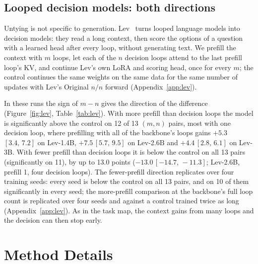 \documentclass[11pt]{article}
\newcommand{\ci}[2]{\,{\scriptsize\ensuremath{[#1,\,#2]}}}
\begin{document}
\subsection{Looped decision models: both directions}
\label{sec:lev}


Untying is not specific to generation. Lev~\citep{lev} turns looped language models into decision models: they read a
long context, then score the options of a question with a learned head after every loop, without generating text. We
prefill the context with $m$ loops, let each of the $n$ decision loops attend to the last prefill loop's KV, and continue
Lev's own LoRA and scoring head, once for every $m$; the control continues the same weights on the same data for the
same number of updates with Lev's Original $n/n$ forward (Appendix~\ref{app:lev}).

In these runs the sign of $m-n$ gives the direction of the difference (Figure~\ref{fig:lev}, Table~\ref{tab:lev}). With more prefill than decision
loops the model is significantly above the control on 12 of 13 $(m,n)$ pairs, most with one decision loop, where prefilling
with all of the backbone's loops gains $+5.3$\ci{3.4}{7.2} on Lev-1.4B, $+7.5$\ci{5.7}{9.5} on Lev-2.6B and
$+4.4$\ci{2.8}{6.1} on Lev-3B. With fewer prefill than decision loops it is below the control on all 13 pairs
(significantly on 11), by up to 13.0 points ($-13.0$\ci{-14.7}{-11.3}; Lev-2.6B, prefill 1, four decision loops). The
fewer-prefill direction replicates over four training seeds: every seed is below the control on all 13 pairs, and on 10
of them significantly in every seed; the more-prefill comparison at the backbone's full loop count is replicated over
four seeds and against a control trained twice as long (Appendix~\ref{app:lev}). As in the task map, the context gains from
many loops and the decision can then stop early.



\section{Method Details}
\label{app:method}
\end{document}
